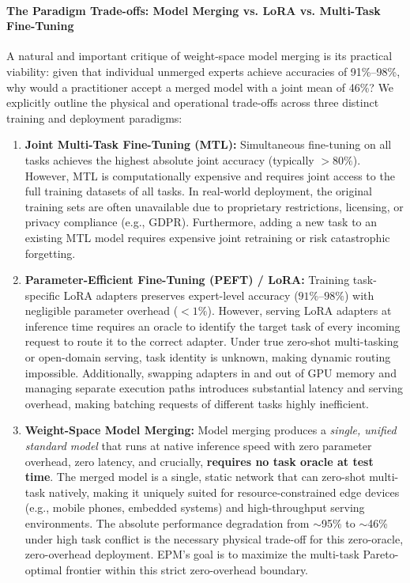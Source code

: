 \paragraph{The Paradigm Trade-offs: Model Merging vs. LoRA vs. Multi-Task Fine-Tuning}
A natural and important critique of weight-space model merging is its practical viability: given that individual unmerged experts achieve accuracies of 91\%--98\%, why would a practitioner accept a merged model with a joint mean of 46\%? We explicitly outline the physical and operational trade-offs across three distinct training and deployment paradigms:
\begin{enumerate}
  \item \textbf{Joint Multi-Task Fine-Tuning (MTL):} Simultaneous fine-tuning on all tasks achieves the highest absolute joint accuracy (typically $>80\%$). However, MTL is computationally expensive and requires joint access to the full training datasets of all tasks. In real-world deployment, the original training sets are often unavailable due to proprietary restrictions, licensing, or privacy compliance (e.g., GDPR). Furthermore, adding a new task to an existing MTL model requires expensive joint retraining or risk catastrophic forgetting.
  \item \textbf{Parameter-Efficient Fine-Tuning (PEFT) / LoRA:} Training task-specific LoRA adapters preserves expert-level accuracy ($91\%$--$98\%$) with negligible parameter overhead ($<1\%$). However, serving LoRA adapters at inference time requires an oracle to identify the target task of every incoming request to route it to the correct adapter. Under true zero-shot multi-tasking or open-domain serving, task identity is unknown, making dynamic routing impossible. Additionally, swapping adapters in and out of GPU memory and managing separate execution paths introduces substantial latency and serving overhead, making batching requests of different tasks highly inefficient.
  \item \textbf{Weight-Space Model Merging:} Model merging produces a \emph{single, unified standard model} that runs at native inference speed with zero parameter overhead, zero latency, and crucially, \textbf{requires no task oracle at test time}. The merged model is a single, static network that can zero-shot multi-task natively, making it uniquely suited for resource-constrained edge devices (e.g., mobile phones, embedded systems) and high-throughput serving environments. The absolute performance degradation from $\sim$95\% to $\sim$46\% under high task conflict is the necessary physical trade-off for this zero-oracle, zero-overhead deployment. EPM's goal is to maximize the multi-task Pareto-optimal frontier within this strict zero-overhead boundary.
\end{enumerate}

